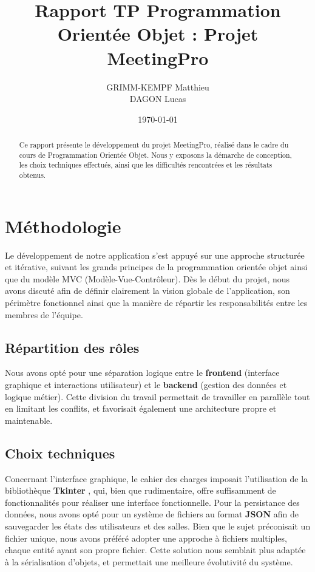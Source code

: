 \documentclass[a4paper,12pt]{article}
\title{Rapport TP Programmation Orient\'ee Objet : Projet MeetingPro}
\author{
  GRIMM-KEMPF Matthieu \\
  DAGON Lucas
}
\date{\today}
\begin{document}
\maketitle

\begin{abstract}
    Ce rapport pr\'esente le d\'eveloppement du projet MeetingPro, r\'ealis\'e dans le cadre du cours de Programmation Orient\'ee Objet. Nous y exposons la d\'emarche de conception, les choix techniques effectu\'es, ainsi que les difficult\'es rencontr\'ees et les r\'esultats obtenus.
\end{abstract}

\tableofcontents
\newpage

\section{M\'ethodologie}

Le développement de notre application s’est appuyé sur une approche structurée et itérative, suivant les grands principes de la programmation orientée objet ainsi que du modèle MVC (Modèle-Vue-Contrôleur). Dès le début du projet, nous avons discuté afin de définir clairement la vision globale de l'application, son périmètre fonctionnel ainsi que la manière de répartir les responsabilités entre les membres de l'équipe.


\subsection*{Répartition des rôles}
Nous avons opté pour une séparation logique entre le \textbf{frontend} (interface graphique et interactions utilisateur) et le \textbf{backend} (gestion des données et logique métier). Cette division du travail permettait de travailler en parallèle tout en limitant les conflits, et favorisait également une architecture propre et maintenable.

\subsection*{Choix techniques}
Concernant l'interface graphique, le cahier des charges imposait l'utilisation de la bibliothèque \textbf{Tkinter} \cite{python_tk}, qui, bien que rudimentaire, offre suffisamment de fonctionnalités pour réaliser une interface fonctionnelle. Pour la persistance des données, nous avons opté pour un système de fichiers au format \textbf{JSON} afin de sauvegarder les états des utilisateurs et des salles. Bien que le sujet préconisait un fichier unique, nous avons préféré adopter une approche à fichiers multiples, chaque entité ayant son propre fichier. Cette solution nous semblait plus adaptée à la sérialisation d’objets, et permettait une meilleure évolutivité du système.
\end{document}
